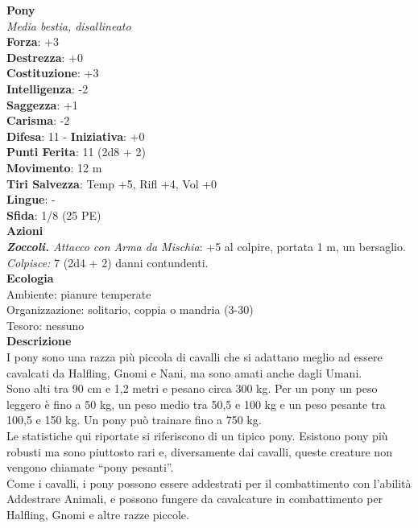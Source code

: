 \begin{multicols}{2}
\medskip\textbf{Pony}\\
\emph{Media bestia, disallineato}\\
\textbf{Forza}: +3\\
\textbf{Destrezza}: +0\\
\textbf{Costituzione}: +3\\
\textbf{Intelligenza}: -2\\
\textbf{Saggezza}: +1\\
\textbf{Carisma}: -2\\
\textbf{Difesa}: 11 - \textbf{Iniziativa}: +0\\
\textbf{Punti Ferita}: 11 (2d8 + 2)\\
\textbf{Movimento}: 12 m\\
\textbf{Tiri Salvezza}: Temp +5, Rifl +4, Vol +0 \\
\textbf{Lingue}: -\\
\textbf{Sfida}: 1/8 (25 PE)\smallskip\\
\smallskip\textbf{Azioni}\\
\emph{\textbf{Zoccoli.} Attacco con Arma da Mischia}: +5 al colpire, portata 1 m, un bersaglio.\\
\emph{Colpisce:} 7 (2d4 + 2) danni contundenti.\\
\textbf{Ecologia}\\
Ambiente: pianure temperate\\
Organizzazione: solitario, coppia o mandria (3-30)\\
Tesoro: nessuno\\
\textbf{Descrizione}\\

I pony sono una razza più piccola di cavalli che si adattano meglio ad essere cavalcati da Halfling, Gnomi e Nani, ma sono amati anche dagli Umani.\\

Sono alti tra 90 cm e 1,2 metri e pesano circa 300 kg. Per un pony un peso leggero è fino a 50 kg, un peso medio tra 50,5 e 100 kg e un peso pesante tra 100,5 e 150 kg. Un pony può trainare fino a 750 kg.\\

Le statistiche qui riportate si riferiscono di un tipico pony. Esistono pony più robusti  ma sono piuttosto rari e, diversamente dai cavalli, queste creature non vengono chiamate “pony pesanti”.\\

Come i cavalli, i pony possono essere addestrati per il combattimento con l'abilità Addestrare Animali, e possono fungere da cavalcature in combattimento per Halfling, Gnomi e altre razze piccole. \\


\end{multicols}
